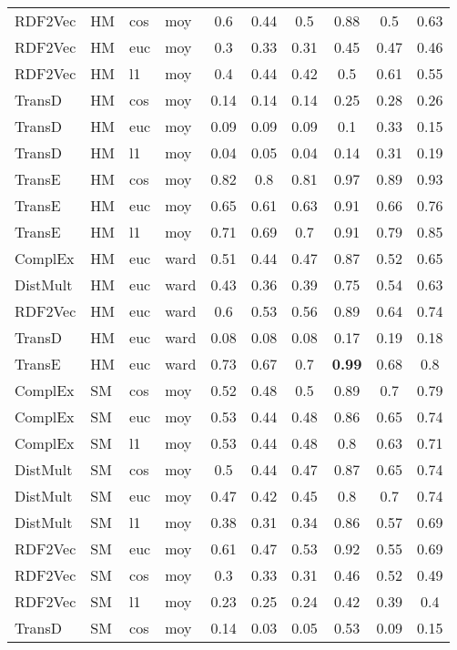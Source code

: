 \begin{longtable}{|llll|ccc|ccc|}
RDF2Vec	&	HM	&	cos	&	moy	&	0.6	&	0.44	&	0.5	&	0.88	&	0.5	&	0.63 \\ 
RDF2Vec	&	HM	&	euc	&	moy	&	0.3	&	0.33	&	0.31	&	0.45	&	0.47	&	0.46 \\ 
RDF2Vec	&	HM	&	l1	&	moy	&	0.4	&	0.44	&	0.42	&	0.5	&	0.61	&	0.55 \\ 
TransD	&	HM	&	cos	&	moy	&	0.14	&	0.14	&	0.14	&	0.25	&	0.28	&	0.26 \\ 
TransD	&	HM	&	euc	&	moy	&	0.09	&	0.09	&	0.09	&	0.1	&	0.33	&	0.15 \\ 
TransD	&	HM	&	l1	&	moy	&	0.04	&	0.05	&	0.04	&	0.14	&	0.31	&	0.19 \\ 
TransE	&	HM	&	cos	&	moy	&	0.82	&	0.8	&	0.81	&	0.97	&	0.89	&	0.93 \\ 
TransE	&	HM	&	euc	&	moy	&	0.65	&	0.61	&	0.63	&	0.91	&	0.66	&	0.76 \\ 
TransE	&	HM	&	l1	&	moy	&	0.71	&	0.69	&	0.7	&	0.91	&	0.79	&	0.85 \\ 
ComplEx	&	HM	&	euc	&	ward	&	0.51	&	0.44	&	0.47	&	0.87	&	0.52	&	0.65 \\ 
DistMult	&	HM	&	euc	&	ward	&	0.43	&	0.36	&	0.39	&	0.75	&	0.54	&	0.63 \\ 
RDF2Vec	&	HM	&	euc	&	ward	&	0.6	&	0.53	&	0.56	&	0.89	&	0.64	&	0.74 \\ 
TransD	&	HM	&	euc	&	ward	&	0.08	&	0.08	&	0.08	&	0.17	&	0.19	&	0.18 \\ 
TransE	&	HM	&	euc	&	ward	&	0.73	&	0.67	&	0.7	&	\textbf{0.99}	&	0.68	&	0.8 \\
\hline
ComplEx	&	SM	&	cos	&	moy	&	0.52	&	0.48	&	0.5	&	0.89	&	0.7	&	0.79 \\ 
ComplEx	&	SM	&	euc	&	moy	&	0.53	&	0.44	&	0.48	&	0.86	&	0.65	&	0.74 \\ 
ComplEx	&	SM	&	l1	&	moy	&	0.53	&	0.44	&	0.48	&	0.8	&	0.63	&	0.71 \\ 
DistMult	&	SM	&	cos	&	moy	&	0.5	&	0.44	&	0.47	&	0.87	&	0.65	&	0.74 \\ 
DistMult	&	SM	&	euc	&	moy	&	0.47	&	0.42	&	0.45	&	0.8	&	0.7	&	0.74 \\ 
DistMult	&	SM	&	l1	&	moy	&	0.38	&	0.31	&	0.34	&	0.86	&	0.57	&	0.69 \\ 
RDF2Vec	&	SM	&	euc	&	moy	&	0.61	&	0.47	&	0.53	&	0.92	&	0.55	&	0.69 \\ 
RDF2Vec	&	SM	&	cos	&	moy	&	0.3	&	0.33	&	0.31	&	0.46	&	0.52	&	0.49 \\ 
RDF2Vec	&	SM	&	l1	&	moy	&	0.23	&	0.25	&	0.24	&	0.42	&	0.39	&	0.4 \\ 
TransD	&	SM	&	cos	&	moy	&	0.14	&	0.03	&	0.05	&	0.53	&	0.09	&	0.15 \\ 

\end{longtable}
